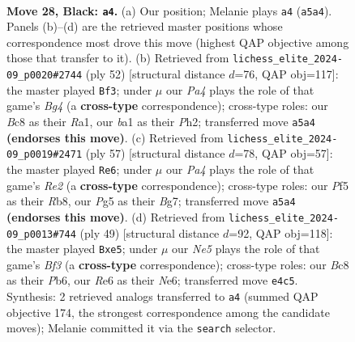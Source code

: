 \documentclass[11pt]{article}
\begin{document}
\clearpage

\begin{figure}[p]\centering
\begin{subfigure}{0.46\textwidth}\centering
\resizebox{\linewidth}{!}{%
\newchessgame
\chessboard[
  setfen={r1b3k1/1p2q2p/4r3/pR1Q1pp1/2N1n3/4P1P1/P4PKP/B3R3 b - - 5 28},
  showmover=false,
  pgfstyle=straightmove, color=movearrow, markmove={a5-a4}
]}
\caption{}
\end{subfigure}\hfill
\begin{subfigure}{0.46\textwidth}\centering
\resizebox{\linewidth}{!}{%
\newchessgame
\chessboard[
  setfen={1k5r/pp3ppb/2p5/3q1PP1/2NrR1B1/7p/PP2Q2P/R6K w - - 1 27},
  showmover=false,
  pgfstyle=straightmove, color=movearrow, markmove={g4-f3}
]}
\caption{}
\end{subfigure}
\\[4pt]
\begin{subfigure}{0.46\textwidth}\centering
\resizebox{\linewidth}{!}{%
\newchessgame
\chessboard[
  setfen={1r4k1/2q1rpb1/p5pp/2p1p3/P1N1Qn2/7P/1P1R1PPB/4R1K1 b - - 0 29},
  showmover=false,
  pgfstyle=straightmove, color=movearrow, markmove={e7-e6}
]}
\caption{}
\end{subfigure}\hfill
\begin{subfigure}{0.46\textwidth}\centering
\resizebox{\linewidth}{!}{%
\newchessgame
\chessboard[
  setfen={r3q1k1/5rp1/pp2nbQp/3NR3/PPP5/7P/5PP1/4R1K1 b - - 2 25},
  showmover=false,
  pgfstyle=straightmove, color=movearrow, markmove={f6-e5}
]}
\caption{}
\end{subfigure}
\caption{\textbf{Move 28, Black: \texttt{a4}.} (a) Our position; Melanie plays \texttt{a4} (\texttt{a5a4}). Panels (b)--(d) are the retrieved master positions whose correspondence most drove this move (highest QAP objective among those that transfer to it). (b) Retrieved from \texttt{lichess\_elite\_2024-09\_p0020\#2744} (ply 52) [structural distance $d$=76, QAP obj=117]: the master played \texttt{Bf3}; under $\mu$ our \emph{Pa4} plays the role of that game's \emph{Bg4} (a \textbf{cross-type} correspondence); cross-type roles: our \emph{B}c8 as their \emph{R}a1, our \emph{b}a1 as their \emph{P}h2; transferred move \texttt{a5a4} \textbf{(endorses this move)}. (c) Retrieved from \texttt{lichess\_elite\_2024-09\_p0019\#2471} (ply 57) [structural distance $d$=78, QAP obj=57]: the master played \texttt{Re6}; under $\mu$ our \emph{Pa4} plays the role of that game's \emph{Re2} (a \textbf{cross-type} correspondence); cross-type roles: our \emph{P}f5 as their \emph{R}b8, our \emph{P}g5 as their \emph{B}g7; transferred move \texttt{a5a4} \textbf{(endorses this move)}. (d) Retrieved from \texttt{lichess\_elite\_2024-09\_p0013\#744} (ply 49) [structural distance $d$=92, QAP obj=118]: the master played \texttt{Bxe5}; under $\mu$ our \emph{Ne5} plays the role of that game's \emph{Bf3} (a \textbf{cross-type} correspondence); cross-type roles: our \emph{B}c8 as their \emph{P}b6, our \emph{R}e6 as their \emph{N}e6; transferred move \texttt{e4c5}. Synthesis: 2 retrieved analogs transferred to \texttt{a4} (summed QAP objective 174, the strongest correspondence among the candidate moves); Melanie committed it via the \texttt{search} selector.}
\label{fig:thought-m55}
\end{figure}
\end{document}
